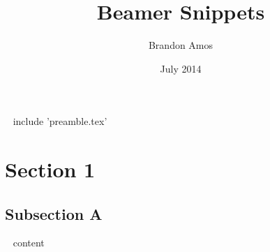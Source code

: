 ~{ include 'preamble.tex' }~


\title{Beamer Snippets}\author{Brandon Amos}\date{July 2014}

\section{Section 1}
\subsection{Subsection A}
~{{ content }}~


